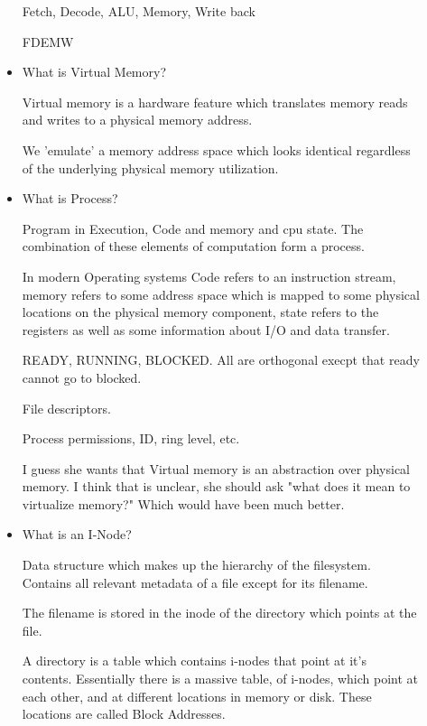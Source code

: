 \documentclass{report}
\begin{document}
\begin{description}
\begin{itemize}
\begin{mdframed}
                    Fetch, Decode, ALU, Memory, Write back

                    FDEMW
                \end{mdframed}
            \item What is Virtual Memory?
                \begin{mdframed}
                    Virtual memory is a hardware feature which translates
                    memory reads and writes to a physical memory address.

                    We 'emulate' a memory address space which looks identical
                    regardless of the underlying physical memory utilization.
                \end{mdframed}
            \item What is Process?
                \begin{mdframed}
                    Program in Execution, Code and memory and cpu state.
                    The combination of these elements of computation form a 
                    process.

                    In modern Operating systems Code refers to an instruction stream,
                    memory refers to some address space which is mapped to some physical
                    locations on the physical memory component, state refers to the
                    registers as well as some information about I/O and data transfer.
                     
                    READY, RUNNING, BLOCKED. All are orthogonal execpt that ready cannot
                    go to blocked.

                    File descriptors.

                    Process permissions, ID, ring level, etc.

                    I guess she wants that Virtual memory is an abstraction over physical
                    memory. I think that is unclear, she should ask "what does it mean to
                    virtualize memory?" Which would have been much better.
                \end{mdframed}
            \item What is an I-Node?
                \begin{mdframed}
                    Data structure which makes up the hierarchy of the filesystem.
                    Contains all relevant metadata of a file except for its filename. 

                    The filename is stored in the inode of the directory which points
                    at the file.

                    A directory is a table which contains i-nodes that point at it's contents.
                    Essentially there is a massive table, of i-nodes, which point at each other,
                    and at different locations in memory or disk. These locations are called
                    Block Addresses.
                \end{mdframed}
        \end{itemize}
\end{description}
\end{document}
